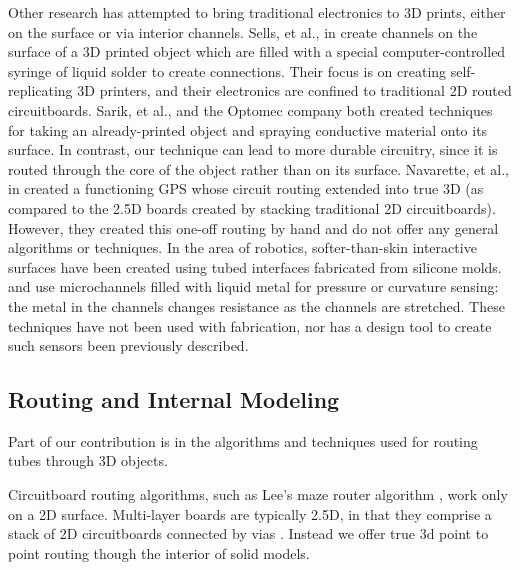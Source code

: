Other research has attempted to bring traditional electronics to 3D prints, either on the surface or via interior channels.  Sells, et al., in \cite{Sells-reprap} create channels on the surface of a 3D printed object which are filled with a special computer-controlled syringe of liquid solder to create connections.  Their focus is on creating self-replicating 3D printers, and their electronics are confined to traditional 2D routed circuitboards.  Sarik, et al., \cite{Sarik-tracebrush}  and the Optomec company \cite{optomec} both created techniques for taking an already-printed object and spraying conductive material onto its surface.  In contrast, our technique can lead to more durable circuitry, since it is routed through the core of the object rather than on its surface.  Navarette, et al., in \cite{Navarrette-gps} created a functioning GPS whose circuit routing extended into true 3D (as compared to the 2.5D boards created by stacking traditional 2D circuitboards).  However, they created this one-off routing by hand and do not offer any general algorithms or techniques.  In the area of robotics, softer-than-skin interactive surfaces have been created using tubed interfaces fabricated from silicone molds.  \cite{Park-microchannels} and \cite{Majidi-curvature} use microchannels filled with liquid metal for pressure or curvature sensing: the metal in the channels changes resistance as the channels are stretched.  These techniques have not been used with fabrication, nor has a design tool to create such sensors been previously described.

\subsection{Routing and Internal Modeling}

Part of our contribution is in the algorithms and techniques used for routing tubes through 3D objects.

Circuitboard routing algorithms, such as Lee's maze router algorithm , work only on a 2D surface. Multi-layer boards are typically 2.5D, in that they comprise a stack of 2D circuitboards connected by vias .  Instead we offer true 3d point to point routing though the interior of solid models.


